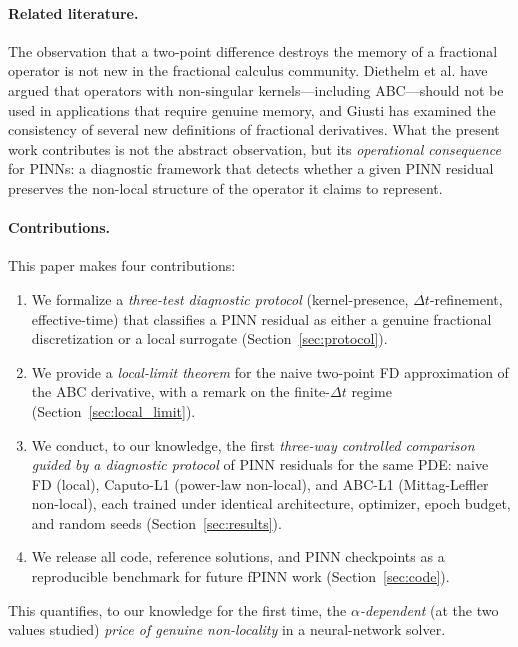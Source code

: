 \documentclass[11pt]{article}
\begin{document}
\paragraph{Related literature.}
The observation that a two-point difference destroys the memory of a fractional operator is not new in the fractional calculus community. Diethelm et al. \cite{Diethelm2020} have argued that operators with non-singular kernels---including ABC---should not be used in applications that require genuine memory, and Giusti \cite{Giusti2018} has examined the consistency of several new definitions of fractional derivatives. What the present work contributes is not the abstract observation, but its \emph{operational consequence} for PINNs: a diagnostic framework that detects whether a given PINN residual preserves the non-local structure of the operator it claims to represent.

\paragraph{Contributions.}
This paper makes four contributions:
\begin{enumerate}[label=(\roman*)]
\item We formalize a \emph{three-test diagnostic protocol} (kernel-presence, \(\Delta t\)-refinement, effective-time) that classifies a PINN residual as either a genuine fractional discretization or a local surrogate (Section~\ref{sec:protocol}).
\item We provide a \emph{local-limit theorem} for the naive two-point FD approximation of the ABC derivative, with a remark on the finite-\(\Delta t\) regime (Section~\ref{sec:local_limit}).
\item We conduct, to our knowledge, the first \emph{three-way controlled comparison guided by a diagnostic protocol} of PINN residuals for the same PDE: naive FD (local), Caputo-L1 (power-law non-local), and ABC-L1 (Mittag-Leffler non-local), each trained under identical architecture, optimizer, epoch budget, and random seeds (Section~\ref{sec:results}).
\item We release all code, reference solutions, and PINN checkpoints as a reproducible benchmark for future fPINN work (Section~\ref{sec:code}).
\end{enumerate}

This quantifies, to our knowledge for the first time, the \emph{\(\alpha\)-dependent} (at the two values studied) \emph{price of genuine non-locality} in a neural-network solver.
\end{document}
